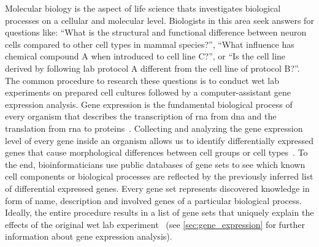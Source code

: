 \documentclass{thesisclass}
\begin{document}
Molecular biology is the aspect of life science thats investigates biological processes on a cellular and molecular level. Biologists in this area seek answers for questions like: ``What is the structural and functional difference between neuron cells compared to other cell types in mammal species?'', ``What influence has chemical compound A when introduced to cell line C?'', or ``Is the cell line derived by following lab protocol A different from the cell line of protocol B?''.
The common procedure to research these questions is to conduct wet lab experiments on prepared cell cultures followed by a computer-assistant gene expression analysis. 
Gene expression is the fundamental biological process of every organism that describes the transcription of \acrfull{rna} from \acrfull{dna} and the translation from \acrshort{rna} to proteins~\cite{citeulike:691434}. 
Collecting and analyzing the gene expression level of every gene inside an organism allows us to identify differentially expressed genes that cause morphological differences between cell groups or cell types~\cite{doi:10.1093/bioinformatics/btp616}. To the end, bioinformaticians use public databases of gene sets to see which known cell components or biological processes are reflected by the previously inferred list of differential expressed genes. 
Every gene set represents discovered knowledge in form of name, description and involved genes of a particular biological process. 
Ideally, the entire procedure results in a list of gene sets that uniquely explain the effects of the original wet lab experiment~\cite{doi:10.1093/nar/gks461} (see \cref{sec:gene_expression} for further information about gene expression analysis).
\end{document}

